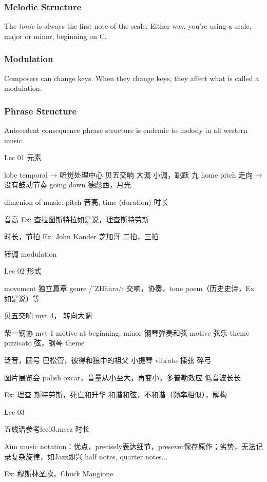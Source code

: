\subsubsection{Melodic Structure}
The \emph{tonic} is always the first note of the scale.
Either way, you're using a scale, major or minor, beginning on C.

\subsubsection{Modulation}
Composers can change keys. When they change keys, 
they affect what is called a modulation.

\subsubsection{Phrase Structure}
Antecedent consequence phrase structure is endemic 
to melody in all western music.

Lec 01 元素

	
lobe temporal → 听觉处理中心   				贝五交响
大调 小调，跳跃					                九		
home pitch
走向 → 没有鼓动节奏 going down				德彪西，月光

dimenion of music: pitch 音高, time (duration) 时长


音高
Ex: 查拉图斯特拉如是说，理查斯特劳斯

时长，节拍
Ex: John Kander 芝加哥 二拍，三拍

转调 modulation


Lec 02 形式


movement 独立篇章
genre /ˈZHänrə/: 交响，协奏，tone poem（历史史诗，Ex 如是说）等

贝五交响 mvt 4， 转向大调

柴一钢协 mvt 1
motive at beginning, minor
钢琴弹奏和弦 motive
弦乐 theme
pizzicato 弦，钢琴 theme

泛音，圆号
巴松管，彼得和狼中的祖父
小提琴 vibrato 揉弦 碎弓

图片展览会 polish oxcar，音量从小至大，再变小，多普勒效应
低音波长长

Ex: 理查 斯特劳斯，死亡和升华
和谐和弦，不和谐（频率相似），解构


Lec 03

	 五线谱参考lec03.mscz 时长


Aim
music notation：优点，precisely表达细节，presever保存原作；劣势，无法记录复杂旋律，如Jazz即兴
half notes, quarter notes...

Ex: 穆斯林圣歌，Chuck Mangione

